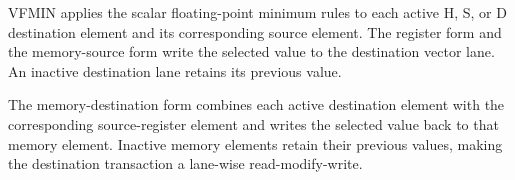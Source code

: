 VFMIN applies the scalar floating-point minimum rules to each active H, S, or
D destination element and its corresponding source element. The register form
and the memory-source form write the selected value to the destination vector
lane. An inactive destination lane retains its previous value.

The memory-destination form combines each active destination element with the
corresponding source-register element and writes the selected value back to
that memory element. Inactive memory elements retain their previous values,
making the destination transaction a lane-wise read-modify-write.
